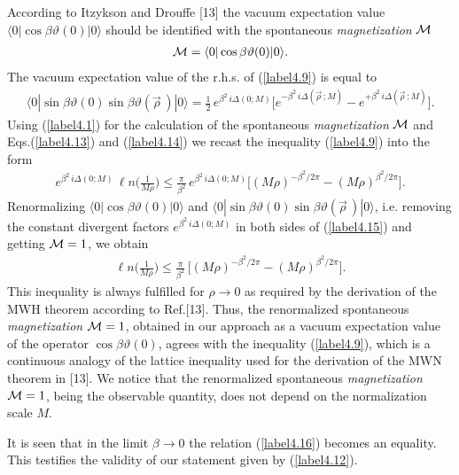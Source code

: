 \documentclass[a4paper,12pt] {article}
\begin{document}
According to Itzykson and Drouffe [13] the vacuum expectation value
$\langle 0|\cos\beta\vartheta(0)|0\rangle$ should be identified with
the spontaneous {\it magnetization} ${\cal M}$
%
\begin{eqnarray}\label{label4.13}
{\cal M} = \langle 0|\cos\beta\vartheta(0)|0\rangle.
\end{eqnarray}
%
The vacuum expectation value of the r.h.s. of (\ref{label4.9}) is
equal to
%
\begin{eqnarray}\label{label4.14}
\langle
0|\sin\beta\vartheta(0)\sin\beta\vartheta(\vec{\rho}\,)|0\rangle =
\frac{1}{2}\,e^{\textstyle \beta^2\,i\Delta(0; M)}\Bigg[e^{\textstyle
- \beta^2\,i\Delta(\vec{\rho}\,; M)} - e^{\textstyle +
\beta^2\,i\Delta(\vec{\rho}\,; M)}\Bigg].
\end{eqnarray}
%
Using (\ref{label4.1}) for the calculation of the spontaneous {\it
magnetization } ${\cal M}$ and Eqs.(\ref{label4.13}) and
(\ref{label4.14}) we recast the inequality (\ref{label4.9}) into the
form
%
\begin{eqnarray}\label{label4.15}
e^{\textstyle \beta^2\,i\Delta(0;M)}\,{\ell
n}\Bigg(\frac{1}{M\rho}\Bigg)\le \frac{\pi}{\beta^2}\,e^{\textstyle
\beta^2\,i\Delta(0;M)}\Big[(M\rho)^{\textstyle -\beta^2/2\pi} -
(M\rho)^{\textstyle \beta^2/2\pi}\Big].
\end{eqnarray}
%
Renormalizing $\langle 0|\cos\beta\vartheta(0)|0\rangle$ and $\langle
0|\sin\beta\vartheta(0)\sin\beta\vartheta(\vec{\rho}\,)|0\rangle$,
i.e. removing the constant divergent factors $e^{\textstyle
\beta^2\,i\Delta(0;M)}$ in both sides of (\ref{label4.15}) and getting
${\cal M} = 1$, we obtain
%
\begin{eqnarray}\label{label4.16}
{\ell n}\Bigg(\frac{1}{M\rho}\Bigg)\le
\frac{\pi}{\beta^2}\,\Big[(M\rho)^{\textstyle -\beta^2/2\pi} -
(M\rho)^{\textstyle \beta^2/2\pi}\Big].
\end{eqnarray}
%
This inequality is always fulfilled for $\rho \to 0$ as required by
the derivation of the MWH theorem according to Ref.[13]. Thus, the
renormalized spontaneous {\it magnetization} ${\cal M} = 1$, obtained
in our approach as a vacuum expectation value of the operator
$\cos\beta\vartheta(0)$, agrees with the inequality (\ref{label4.9}),
which is a continuous analogy of the lattice inequality used for the
derivation of the MWN theorem in [13]. We notice that the renormalized
spontaneous {\it magnetization} ${\cal M} = 1$, being the observable
quantity, does not depend on the normalization scale $M$.

It is seen that in the limit $\beta \to 0$ the relation
(\ref{label4.16}) becomes an equality. This testifies the validity of
our statement given by (\ref{label4.12}).
\end{document}
